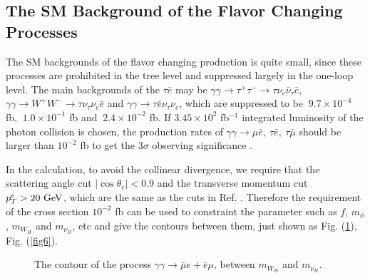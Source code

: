 \documentclass[preprint,aps,12pt,showpacs,nofootinbib,tightenlines]{revtex4}
\begin{document}
\subsection{The SM Background of the Flavor Changing Processes}
The SM backgrounds of the flavor changing production is quite small, since
these processes are prohibited in the tree level and suppressed largely in the one-loop level\cite{susy-r-con1}.
The main backgrounds of the
$\tau \bar e$ may be $\gamma\gamma \to \tau ^{+}\tau^{-} \to \tau \nu_{e}\bar{\nu}_{\tau}\bar e$,
$\gamma\gamma \to W^{+}W^{-}\to \tau \nu_\tau \nu_e \bar e $
and  $\gamma\gamma \to \tau \bar e \nu_\tau\nu_e$,  which
are suppressed to be $~9.7\times 10^{-4}$ fb, $~1.0\times 10^{-1}$ fb and
$~2.4\times 10^{-2}$ fb.%
If $3.45 \times 10^2$ fb$^{-1}$ integrated luminosity of the photon collision \cite{tesla} is chosen,
the production rates of $\gamma \gamma \to \mu\bar e,~\tau\bar{e}, ~\tau \bar{\mu}$
should be larger than $10^{-2}$ fb to get
the $3 \sigma$ observing significance \cite{susy-r-con1,rvio-susy-rrll}.

In the calculation, to avoid the collinear divergence, we require that the scattering angle cut $|\cos\theta_e|<0.9$
and the transverse momentum cut $p^e_{T}>20{\rm ~GeV}$, which are the same as the cuts in Ref. \cite{susy-r-con1}.
Therefore the requirement of the cross section $10^{-2}$ fb can be used to constraint the parameter
such as $f$, $m_\phi $, $m_{W_H}$ and $m_{\nu_H}$, etc and give the contours between them, just shown as Fig. (\ref{fig4}), Fig. (\ref{fig6}).


\def\figsubcap#1{\par\noindent\centering\footnotesize(#1)}
\begin{figure}[bht]%
\begin{center}
\hspace{-2.5cm}
 \parbox{10.05cm}{ } %
  \caption{ The contour of the process $\gamma\gamma \to \bar \mu e + \bar e \mu$, %
           between  $m_{W_H}$ and  $m_{\nu_H} $. %
\label{fig4} }
\end{center}
\end{figure}
\end{document}
